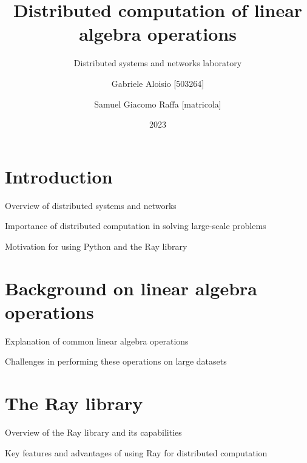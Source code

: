 \documentclass{beamer}
\title{Distributed computation of linear algebra operations}
\subtitle{Distributed systems and networks laboratory}
\author{
    Gabriele Aloisio [503264] \and
    Samuel Giacomo Raffa [matricola]
    }
\institute{Università degli studi di Messina}
\date{2023}
\begin{document}
\maketitle

\section{Introduction}
\begin{frame}{Overview of distributed systems and networks}

\end{frame}


\begin{frame}{Importance of distributed computation in solving large-scale problems}

\end{frame}

\begin{frame}{Motivation for using Python and the Ray library}

\end{frame}


\section{Background on linear algebra operations}
\begin{frame}{Explanation of common linear algebra operations}

\end{frame}

\begin{frame}{Challenges in performing these operations on large datasets}

\end{frame}

\begin{frame}{}

\end{frame}

\section{The Ray library}
\begin{frame}{Overview of the Ray library and its capabilities}

\end{frame}

\begin{frame}{Key features and advantages of using Ray for distributed computation}

\end{frame}
\end{document}
